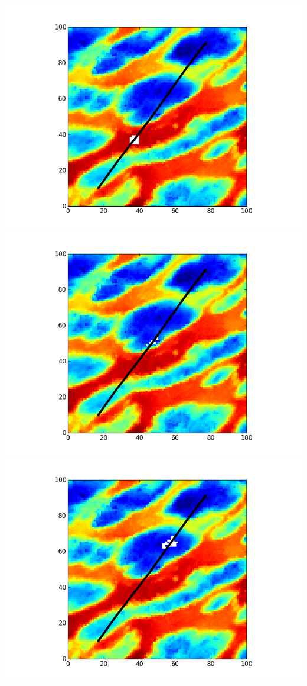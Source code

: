 \documentclass[11pt]{beamer}
\begin{document}
\begin{frame}
\begin{overlayarea}{\textwidth}{\textheight}
 {\includegraphics[scale=.5]{../data/illustration_recalage_baseline/plot_A_10_17_B_91_77_iteration_002.png}}
 {\includegraphics[scale=.5]{../data/illustration_recalage_baseline/plot_A_10_17_B_91_77_iteration_003.png}}
 {\includegraphics[scale=.5]{../data/illustration_recalage_baseline/plot_A_10_17_B_91_77_iteration_004.png}}

\end{overlayarea}
\end{frame}
\end{document}
